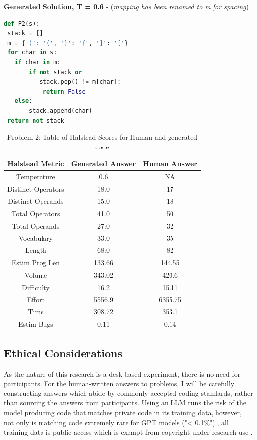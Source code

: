 \documentclass[manuscript,screen,review,sigconf]{acmart}
\begin{document}
\textbf{Generated Solution, T = 0.6} - (\textit{mapping has been renamed to m for spacing})
\begin{lstlisting}[language=Python]
def P2(s):
 stack = []
 m = {')': '(', '}': '{', ']': '['}
 for char in s:
   if char in m:
       if not stack or
          stack.pop() != m[char]:
           return False
   else:
       stack.append(char)
 return not stack
\end{lstlisting}


\begin{table}[H]
    \centering
    \begin{tabular}{|c|c|c|} \hline
         \textbf{Halstead Metric} & Generated Answer & Human Answer\\
         \hline
         Temperature & 0.6 & NA \\
         Distinct Operators & 18.0 & 17\\
         Distinct Operands & 15.0 & 18\\
         Total Operators & 41.0 & 50\\
         Total Operands & 27.0 & 32\\
         Vocabulary & 33.0 & 35\\
         Length & 68.0 & 82\\
         Estim Prog Len & 133.66 & 144.55 \\
         Volume &  343.02 & 420.6\\
         Difficulty &  16.2 & 15.11\\
         Effort & 5556.9 & 6355.75\\
         Time &  308.72 & 353.1\\
         Estim Bugs & 0.11 & 0.14\\
         \hline
    \end{tabular}
    \caption{Problem 2: Table of Halstead Scores for Human and generated code}
    \label{tab:HalsteadMetrics}
\end{table}

\subsection{Ethical Considerations}
As the nature of this research is a desk-based experiment, there is no need for participants. For the human-written answers to problems, I will be carefully constructing answers which abide by commonly accepted coding standards, rather than sourcing the answers from participants. Using an LLM runs the risk of the model producing code that matches private code in its training data, however, not only is matching code extremely rare for GPT models ("< 0.1\%") \cite{CodexRelPaper}, all training data is public access which is exempt from copyright under research use \cite{ExceptionToCopyright}.
\end{document}
